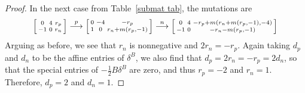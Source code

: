 \documentclass{amsart}
\theoremstyle{definition}
\theoremstyle{remark}
\numberwithin{equation}{section}
\newcommand{\0}{{\mathbf{0}}}
\begin{document}
\begin{proof}
In the next case from Table~\ref{submat tab}, the mutations are
\[\begin{bsmallmatrix*}
0 & 4 & r_p\\
-1 & 0 &r_n
\end{bsmallmatrix*}\overset{p}{\longrightarrow}
\begin{bsmallmatrix*}
0 & -4 & -r_p\\
1 & 0 &r_n+m(r_p,-1)
\end{bsmallmatrix*}\overset{n}{\longrightarrow}
\begin{bsmallmatrix*}
0 & 4 &-r_p+m(r_n+m(r_p,-1),-4)\\
-1 & 0 &-r_n-m(r_p,-1)
\end{bsmallmatrix*}
\]
Arguing as before, we see that $r_n$ is nonnegative and $2r_n=-r_p$.
Again taking $d_p$ and $d_n$ to be the affine entries of $\delta^B$, we also find that $d_p=2r_n=-r_p=2d_n$, so that the special entries of $-\frac12B\delta^B$ are zero, and thus $r_p=-2$ and $r_n=1$.
Therefore,
$d_p=2$ and $d_n=1$.


\end{proof}
\end{document}
